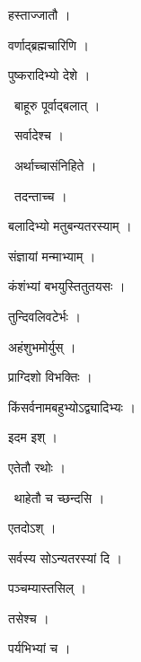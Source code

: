 \documentclass[10pt, openany, oneside]{book}
\begin{document}
\noindent हस्ताज्जातौ ।

\noindent वर्णाद्ब्रह्मचारिणि ।

\noindent पुष्करादिभ्यो देशे ।

\par\noindent\hspace{1.5em}{\vps वा॰}~{\qt बाहूरु पूर्वाद्बलात् ।}

\par\noindent\hspace{1.5em}{\vps वा॰}~{\qt सर्वादेश्च ।}

\par\noindent\hspace{1.5em}{\vps वा॰}~{\qt अर्थाच्चासंनिहिते ।}

\par\noindent\hspace{1.5em}{\vps वा॰}~{\qt तदन्ताच्च ।}

\noindent बलादिभ्यो मतुबन्यतरस्याम् ।

\noindent संज्ञायां मन्माभ्याम् ।

\noindent कंशंभ्यां बभयुस्तितुतयसः ।

\noindent तुन्दिवलिवटेर्भः ।

\noindent अहंशुभमोर्युस् ।

\noindent प्राग्दिशो विभक्तिः ।

\noindent किंसर्वनामबहुभ्योऽद्व्यादिभ्यः ।

\noindent इदम इश् ।

\noindent एतेतौ रथोः ।

\par\noindent\hspace{1.5em}{\vps वा॰}~{\qt थाहेतौ च च्छन्दसि ।}

\noindent एतदोऽश् ।

\noindent सर्वस्य सोऽन्यतरस्यां दि ।

\noindent पञ्चम्यास्तसिल् ।

\noindent तसेश्च ।

\noindent पर्यभिभ्यां च ।
\end{document}

